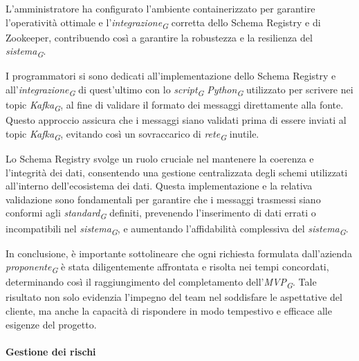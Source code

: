 L'amministratore ha configurato l'ambiente containerizzato per garantire l'operatività ottimale e l'\textit{integrazione}\textsubscript{\textit{G}} corretta dello Schema Registry e di Zookeeper, contribuendo così a garantire la robustezza e la resilienza del \textit{sistema}\textsubscript{\textit{G}}.

I programmatori si sono dedicati all'implementazione dello Schema Registry e all'\textit{integrazione}\textsubscript{\textit{G}} di quest’ultimo con lo \textit{script}\textsubscript{\textit{G}} \textit{Python}\textsubscript{\textit{G}} utilizzato per scrivere nei topic \textit{Kafka}\textsubscript{\textit{G}}, al fine di validare il formato dei messaggi direttamente alla fonte. Questo approccio assicura che i messaggi siano validati prima di essere inviati al topic \textit{Kafka}\textsubscript{\textit{G}}, evitando così un sovraccarico di \textit{rete}\textsubscript{\textit{G}} inutile.

Lo Schema Registry svolge un ruolo cruciale nel mantenere la coerenza e l'integrità dei dati, consentendo una gestione centralizzata degli schemi utilizzati all'interno dell'ecosistema dei dati. Questa implementazione e la relativa validazione sono fondamentali per garantire che i messaggi trasmessi siano conformi agli \textit{standard}\textsubscript{\textit{G}} definiti, prevenendo l'inserimento di dati errati o incompatibili nel \textit{sistema}\textsubscript{\textit{G}}, e aumentando l'affidabilità complessiva del \textit{sistema}\textsubscript{\textit{G}}.

In conclusione, è importante sottolineare che ogni richiesta formulata dall’azienda \textit{proponente}\textsubscript{\textit{G}} è stata diligentemente affrontata e risolta nei tempi concordati, determinando così il raggiungimento del completamento dell'\textit{MVP}\textsubscript{\textit{G}}. Tale risultato non solo evidenzia l’impegno del team nel soddisfare le aspettative del cliente, ma anche la capacità di rispondere in modo tempestivo e efficace alle esigenze del progetto.


\paragraph{Gestione dei rischi}

